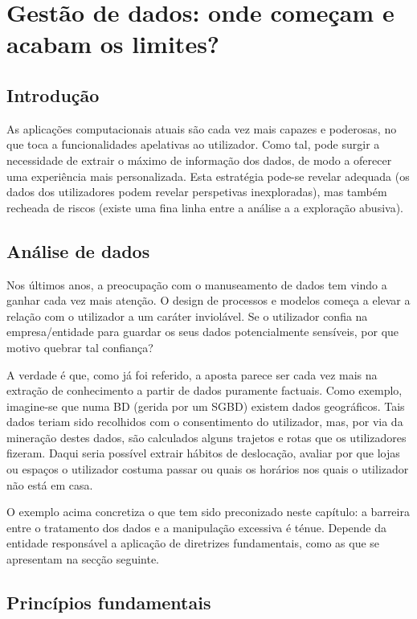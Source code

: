 \chapter{Gestão de dados: onde começam e acabam os limites?}
\label{chap2:limites}

\section{Introdução}
\label{chap2:intro}
As aplicações computacionais atuais são cada vez mais capazes e poderosas, no que toca a funcionalidades apelativas ao utilizador. Como tal, pode surgir a necessidade de extrair o máximo de informação dos dados, de modo a oferecer uma experiência mais personalizada. Esta estratégia pode-se revelar adequada (os dados dos utilizadores podem revelar perspetivas inexploradas), mas também recheada de riscos (existe uma fina linha entre a análise a a exploração abusiva).

\section{Análise de dados}
\label{chap2:analise}
Nos últimos anos, a preocupação com o manuseamento de dados tem vindo a ganhar cada vez mais atenção. O design de processos e modelos começa a elevar a relação com o utilizador a um caráter inviolável. Se o utilizador confia na empresa/entidade para guardar os seus dados potencialmente sensíveis, por que motivo quebrar tal confiança?

A verdade é que, como já foi referido, a aposta parece ser cada vez mais na extração de conhecimento a partir de dados puramente factuais. Como exemplo, imagine-se que numa \ac{BD} (gerida por um \ac{SGBD}) existem dados geográficos. Tais dados teriam sido recolhidos com o consentimento do utilizador, mas, por via da mineração destes dados, são calculados alguns trajetos e rotas que os utilizadores fizeram. Daqui seria possível extrair hábitos de deslocação, avaliar por que lojas ou espaços o utilizador costuma passar ou quais os horários nos quais o utilizador não está em casa.

O exemplo acima concretiza o que tem sido preconizado neste capítulo: a barreira entre o tratamento dos dados e a manipulação excessiva é ténue. Depende da entidade responsável a aplicação de diretrizes fundamentais, como as que se apresentam na secção seguinte.

\section{Princípios fundamentais}
\label{chap3:principios}


